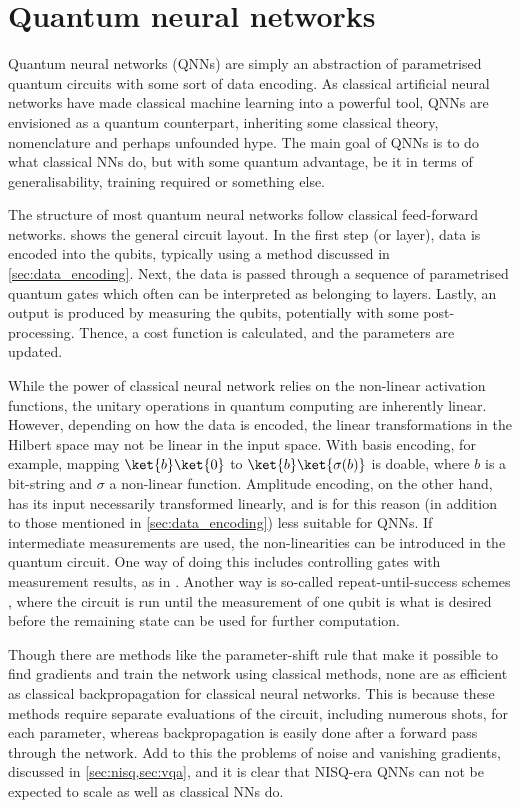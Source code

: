 \section{Quantum neural networks}
Quantum neural networks (QNNs) are simply an abstraction of parametrised quantum circuits with some sort of data encoding.
As classical artificial neural networks have made classical machine learning into a powerful tool, QNNs are envisioned as a quantum counterpart, inheriting some classical theory, nomenclature and perhaps unfounded hype.
The main goal of QNNs is to do what classical NNs do, but with some quantum advantage, be it in terms of generalisability, training required or something else.

The structure of most quantum neural networks follow classical feed-forward networks.
 shows the general circuit layout.
In the first step (or layer), data is encoded into the qubits, typically using a method discussed in \cref{sec:data_encoding}.
Next, the data is passed through a sequence of parametrised quantum gates which often can be interpreted as belonging to layers.
Lastly, an output is produced by measuring the qubits, potentially with some post-processing.
Thence, a cost function is calculated, and the parameters are updated.

While the power of classical neural network relies on the non-linear activation functions, the unitary operations in quantum computing are inherently linear.
However, depending on how the data is encoded, the linear transformations in the Hilbert space may not be linear in the input space.
With basis encoding, for example, mapping $\ket{b}\ket{0}$ to $\ket{b}\ket{\sigma(b)}$ is doable, where $b$ is a bit-string and $\sigma$ a non-linear function.
Amplitude encoding, on the other hand, has its input necessarily transformed linearly, and is for this reason (in addition to those mentioned in \cref{sec:data_encoding}) less suitable for QNNs.
If intermediate measurements are used, the non-linearities can be introduced in the quantum circuit.
One way of doing this includes controlling gates with measurement results, as in \cite{cong2019}.
Another way is so-called repeat-until-success schemes \cite{cao2017}, where the circuit is run until the measurement of one qubit is what is desired before the remaining state can be used for further computation.

Though there are methods like the parameter-shift rule that make it possible to find gradients and train the network using classical methods, none are as efficient as classical backpropagation for classical neural networks.
This is because these methods require separate evaluations of the circuit, including numerous shots, for each parameter, whereas backpropagation is easily done after a forward pass through the network.
Add to this the problems of noise and vanishing gradients, discussed in \cref{sec:nisq,sec:vqa}, and it is clear that NISQ-era QNNs can not be expected to scale as well as classical NNs do.

